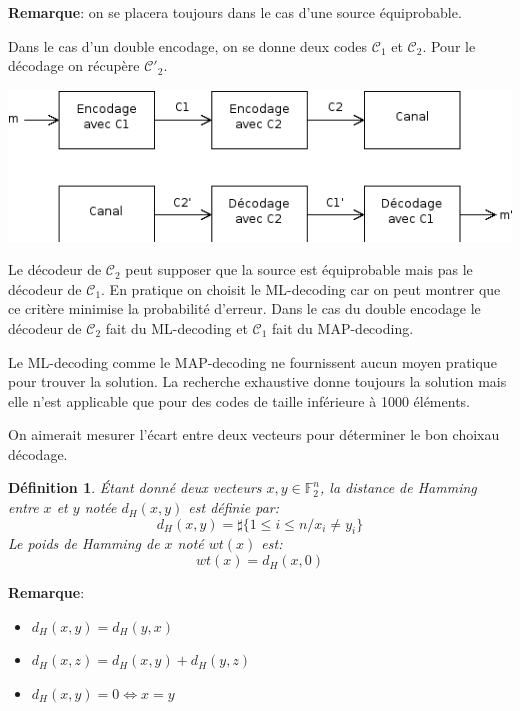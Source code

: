 \documentclass[a4paper,10pt,twocolumn]{article}
\theoremstyle{break}
\newtheorem{mydef}{Définition}
\newenvironment{note}[1]
{\textbf{#1}:}
{}
\newenvironment{remarque}
{\begin{note}{Remarque}}
{\end{note}}
\begin{document}
\begin{remarque}
 on se placera toujours dans le cas d'une source équiprobable.
\end{remarque}

Dans le cas d'un double encodage, on se donne deux codes $\mathcal{C}_1$ et $\mathcal{C}_2$. Pour le décodage on récupère $\mathcal{C}'_2$.
\begin{center}
\includegraphics[width=\linewidth]{double_codage}
\end{center}

Le décodeur de $\mathcal{C}_2$ peut supposer que la source est équiprobable mais pas le décodeur de $\mathcal{C}_1$. 
En pratique on choisit le ML-decoding car on peut montrer que ce critère minimise la probabilité d'erreur.
Dans le cas du double encodage le décodeur de $\mathcal{C}_2$ fait du ML-decoding et $\mathcal{C}_1$ fait du MAP-decoding.

Le ML-decoding comme le MAP-decoding ne fournissent aucun moyen pratique pour trouver la solution.
La recherche exhaustive donne toujours la solution mais elle n'est applicable que pour des codes de taille inférieure à 1000 éléments.

On aimerait mesurer l'écart entre deux vecteurs pour déterminer le \flqq bon choix\frqq au décodage.

\begin{mydef}
 Étant donné deux vecteurs $x,y \in \mathbb{F}_2^n$, la distance de Hamming entre $x$ et $y$ notée $d_H(x,y)$ est définie par:
 $$ d_H(x,y) = \sharp\lbrace 1 \le i \le n / x_i \ne y_i \rbrace $$
 Le poids de Hamming de $x$ noté $wt(x)$ est:
 $$ wt(x) = d_H(x,0) $$
\end{mydef}

\begin{remarque}
\begin{itemize}
 \item $d_H(x,y) = d_H(y,x)$
 \item $d_H(x,z) = d_H(x,y) + d_H(y,z)$
 \item $d_H(x,y) = 0 \Leftrightarrow x = y$
\end{itemize}
\end{remarque}
\end{document}
